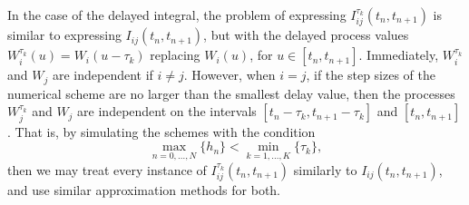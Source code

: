 \documentclass[onefignum]{siamart250211}
\begin{document}
In the case of the delayed integral, the problem of expressing $I_{ij}^{\tau_k}(t_n,t_{n+1})$ is similar to expressing $I_{ij}(t_n,t_{n+1})$, but with the delayed process values $W_i^{\tau_k}(u)=W_i(u-\tau_k)$ replacing $W_i(u)$, for $u\in[t_n,t_{n+1}]$. Immediately, $W_i^{\tau_k}$ and $W_j$ are independent if $i\neq j$. However, when $i=j$, if the step sizes of the numerical scheme are no larger than the smallest delay value, then the processes $W_j^{\tau_k}$ and $W_j$ are independent on the intervals $[t_n-\tau_k,t_{n+1}-\tau_k]$ and $[t_n,t_{n+1}]$. That is, by simulating the schemes with the condition
\[\max_{n=0,\ldots,N}\{h_n\}<\min_{k=1,\ldots,K}\{\tau_k\},\]
then we may treat every instance of $I_{ij}^{\tau_k}(t_n,t_{n+1})$ similarly to $I_{ij}(t_n,t_{n+1})$, and use similar approximation methods for both.
\end{document}

